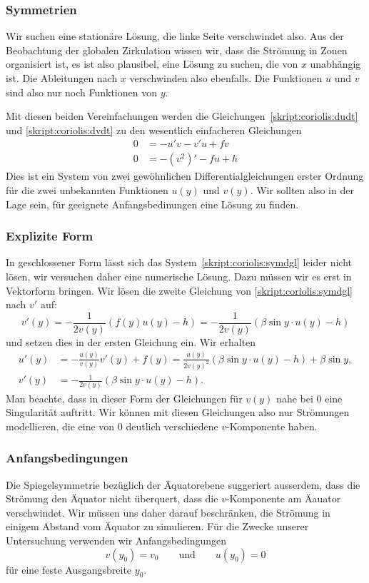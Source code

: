 \subsubsection{Symmetrien}
Wir suchen eine stationäre Lösung, die linke Seite verschwindet also.
Aus der Beobachtung der globalen Zirkulation wissen wir, dass die
Strömung in Zonen organisiert ist, es ist also plausibel, eine
Lösung zu suchen, die von $x$ unabhängig ist.
Die Ableitungen nach $x$ verschwinden also ebenfalls.
Die Funktionen $u$ und $v$ sind also nur noch Funktionen von $y$.

Mit diesen beiden Vereinfachungen werden die
Gleichungen~\eqref{skript:coriolis:dudt}
und
\eqref{skript:coriolis:dvdt}
zu den wesentlich einfacheren Gleichungen
\begin{equation}
\begin{aligned}
0&=-u'v-v'u+fv
\\
0&=-(v^2)' - fu +h
\end{aligned}
\label{skript:coriolis:symdgl}
\end{equation}
Dies ist ein System von zwei gewöhnlichen Differentialgleichungen
erster Ordnung für die zwei unbekannten Funktionen $u(y)$ und $v(y)$.
Wir sollten also in der Lage sein, für geeignete Anfangsbedinungen eine 
Lösung zu finden.

\subsubsection{Explizite Form}
In geschlossener Form lässt sich das System~\eqref{skript:coriolis:symdgl}
leider nicht lösen, wir versuchen daher eine numerische Lösung.
Dazu müssen wir es erst in Vektorform bringen.
Wir lösen die zweite Gleichung von \eqref{skript:coriolis:symdgl}
nach $v'$ auf:
\[
v'(y)
=
-\frac{1}{2v(y)}(f(y)u(y)-h)
=
-\frac{1}{2v(y)}(\beta\sin y\cdot u(y)-h)
\]
und setzen dies in der ersten Gleichung ein.
Wir erhalten
\begin{align}
u'(y)
&=
-\frac{u(y)}{v(y)}v'(y)+f(y)
=
\frac{u(y)}{2v(y)^2} (\beta\sin y\cdot u(y)-h) + \beta \sin y,
\label{skript:coriolis:udgl}
\\
v'(y)
&=
-\frac{1}{2v(y)}(\beta\sin y\cdot u(y)-h).
\label{skript:coriolis:vdgl}
\end{align}
Man beachte, dass in dieser Form der Gleichungen für $v(y)$ nahe bei $0$
eine Singularität auftritt.
Wir können mit diesen Gleichungen also nur Strömungen modellieren, die
eine von $0$ deutlich verschiedene $v$-Komponente haben.

\subsubsection{Anfangsbedingungen}
Die Spiegelsymmetrie bezüglich der Äquatorebene suggeriert ausserdem, dass
die Strömung den Äquator nicht überquert, dass die $v$-Komponente
am Äauator verschwindet.
Wir müssen uns daher darauf beschränken, die Strömung in einigem
Abstand vom Äquator zu simulieren.
Für die Zwecke unserer Untersuchung verwenden wir Anfangsbedingungen
\[
v(y_0)=v_0
\qquad
\text{und}
\qquad
u(y_0)=0
\]
für eine feste Ausgangsbreite $y_0$.

